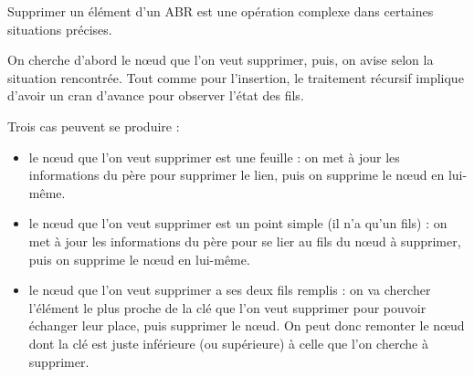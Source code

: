 \documentclass[11pt,a4paper]{article}
\begin{document}
Supprimer un élément d'un ABR est une opération complexe dans certaines situations précises.

On cherche d'abord le nœud que l'on veut supprimer, puis, on avise selon la situation rencontrée.
Tout comme pour l'insertion, le traitement récursif implique d'avoir un cran d'avance pour observer l'état des fils.

\clearpage

Trois cas peuvent se produire :

\medskip

\begin{itemize}
\item le nœud que l'on veut supprimer est une feuille : on met à jour les informations du père pour supprimer le lien, puis on supprime le nœud en lui-même.

\item le nœud que l'on veut supprimer est un point simple (il n'a qu'un fils) : on met à jour les informations du père pour se lier au fils du nœud à supprimer, puis on supprime le nœud en lui-même.

\item le nœud que l'on veut supprimer a ses deux fils remplis : on va chercher l'élément le plus proche de la clé que l'on veut supprimer pour pouvoir échanger leur place, puis supprimer le nœud.
On peut donc remonter le nœud dont la clé est juste inférieure (ou supérieure) à celle que l'on cherche à supprimer.
\end{itemize}

\bigskip

\vfillFirst

\end{document}
